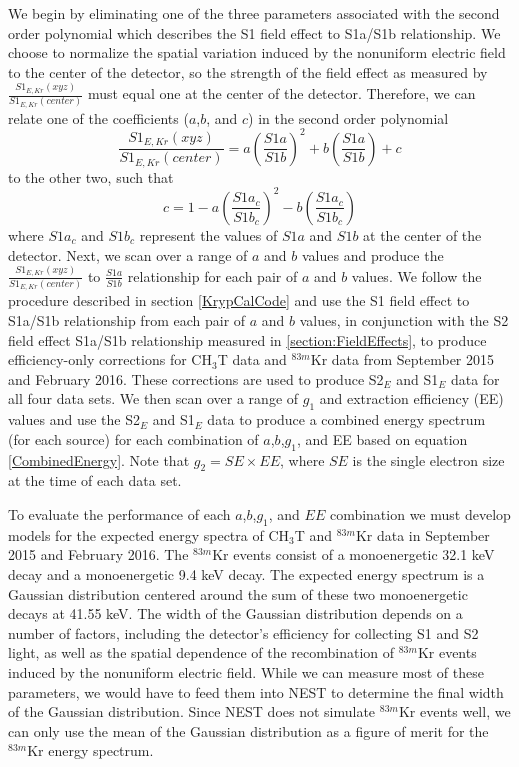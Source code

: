 \documentclass[a4paper,12pt]{article}
\begin{document}
{We begin by eliminating one of the three parameters associated with the second order polynomial which describes the S1 field effect to S1a/S1b relationship.  We choose to normalize the spatial variation induced by the nonuniform electric field to the center of the detector, so the strength of the field effect as measured by $\frac{S1_{E,Kr}(xyz)}{S1_{E,Kr}(center)}$ must equal one at the center of the detector.  Therefore, we can relate one of the coefficients ($a$,$b$, and $c$) in the second order polynomial
\begin{equation}
 \frac{S1_{E,Kr}(xyz)}{S1_{E,Kr}(center)} = a\left(\frac{S1a}{S1b}\right)^2 + b\left(\frac{S1a}{S1b} \right) + c
 \end{equation}
 to the other two, such that
 \begin{equation}
 c=1-a\left(\frac{S1a_c}{S1b_c}\right)^2-b\left(\frac{S1a_c}{S1b_c}\right)
 \end{equation}
 where $S1a_c$ and $S1b_c$ represent the values of $S1a$ and $S1b$ at the center of the detector.  Next, we scan over a range of $a$ and $b$ values and produce the $\frac{S1_{E,Kr}(xyz)}{S1_{E,Kr}(center)}$ to $\frac{S1a}{S1b}$ relationship for each pair of $a$ and $b$ values.  We follow the procedure described in section \ref{KrypCalCode} and use the S1 field effect to S1a/S1b relationship from each pair of $a$ and $b$ values, in conjunction with the S2 field effect S1a/S1b relationship measured in \ref{section:FieldEffects}, to produce efficiency-only corrections for CH$_3$T data and $^{83m}$Kr data from September 2015 and February 2016. These corrections are used to produce S2$_E$ and S1$_E$ data for all four data sets.  We then scan over a range of $g_1$ and extraction efficiency (EE) values and use the S2$_E$ and S1$_E$ data to produce a combined energy spectrum (for each source) for each combination of $a$,$b$,$g_1$, and EE based on equation \ref{CombinedEnergy}.  Note that $g_2=SE \times EE$, where $SE$ is the single electron size at the time of each data set.  

To evaluate the performance of each $a$,$b$,$g_1$, and $EE$ combination we must develop models for the expected energy spectra of CH$_3$T and $^{83m}$Kr data in September 2015 and February 2016.  The $^{83m}$Kr events consist of a monoenergetic 32.1 keV decay and a monoenergetic 9.4 keV decay.  The expected energy spectrum is a Gaussian distribution centered around the sum of these two monoenergetic decays at 41.55 keV.  The width of the Gaussian distribution depends on a number of factors, including the detector's efficiency for collecting S1 and S2 light, as well as the spatial dependence of the recombination of $^{83m}$Kr events induced by the nonuniform electric field.  While we can measure most of these parameters, we would have to feed them into NEST to determine the final width of the Gaussian distribution.  Since NEST does not simulate $^{83m}$Kr events well, we can only use the mean of the Gaussian distribution as a figure of merit for the $^{83m}$Kr energy spectrum.

}
\end{document}
